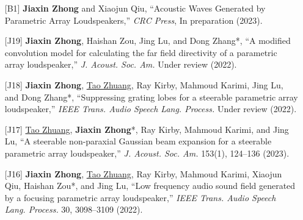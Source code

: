 \documentclass[10pt,a4paper,ragged2e,withhyper]{altacv}
\newcommand{\PubJournal}[1]{\textit{#1}}
\newcommand{\PubTitle}[1]{``{#1,}''}
\newcommand{\PubCorAuthor}[1]{#1*}
\newcommand{\PubMe}[1]{\textbf{#1}}
\begin{document}
\begin{paracol}{1}
\vspace{.5cm}


\begin{itemize}[leftmargin = 25pt]
    \justifying 
    \item[{[B1]}] \PubMe{Jiaxin Zhong} and Xiaojun Qiu, 
    ``Acoustic Waves Generated by Parametric Array Loudspeakers,'' 
    \textit{CRC Press}, In preparation (2023).
\end{itemize}

\divider



\begin{itemize}[leftmargin = 30pt]
    \justifying 
    \item[{[J19]}]
        \PubMe{Jiaxin Zhong}, Haishan Zou, Jing Lu, and \PubCorAuthor{Dong Zhang},
        \PubTitle{A modified convolution model for calculating the far field directivity of a parametric array loudspeaker}
        \PubJournal{J. Acoust. Soc. Am.}
        Under review (2022).

    \item[{[J18]}]
        \PubMe{Jiaxin Zhong}, \underline{Tao Zhuang}, Ray Kirby, Mahmoud Karimi, Jing Lu, and \PubCorAuthor{Dong Zhang},
        \PubTitle{Suppressing grating lobes for a steerable parametric array loudspeaker}
        \PubJournal{IEEE Trans. Audio Speech Lang. Process.}
        Under review (2022).

    \item[{[J17]}]
        \underline{Tao Zhuang}, 
        \PubCorAuthor{\PubMe{Jiaxin Zhong}},
        Ray Kirby, Mahmoud Karimi, and Jing Lu, 
        \PubTitle{A steerable non-paraxial Gaussian beam expansion for a steerable parametric array loudspeaker}
        \PubJournal{J. Acoust. Soc. Am.}
        153(1), 124--136 (2023).
        \href{https://doi.org/10.1121/10.0016816}{\color{accent}\aiDoi}
        \href{https://github.com/JiaxinZhong/JiaxinZhong.github.io/raw/master/publications/journal/Zhuang2023-JASA-PAL_steerable_GBE.pdf}{\color{accent}\faFilePdf[regular]}

    \item[{[J16]}]
        \PubMe{Jiaxin Zhong}, \underline{Tao Zhuang}, Ray Kirby, Mahmoud Karimi, Xiaojun Qiu, \PubCorAuthor{Haishan Zou}, and Jing Lu,
        \PubTitle{Low frequency audio sound field generated by a focusing parametric array loudspeaker}
        \PubJournal{IEEE Trans. Audio Speech Lang. Process.}
        30, 3098--3109 (2022).
        \href{https://doi.org/10.1109/TASLP.2022.3209944}{\color{accent}\aiDoi}
        \href{https://github.com/JiaxinZhong/JiaxinZhong.github.io/raw/master/publications/journal/Zhong2022-IEEETASLP-Focusing_PAL.pdf}{\color{accent}\faFilePdf[regular]}


\end{itemize}
\end{paracol}
\end{document}
